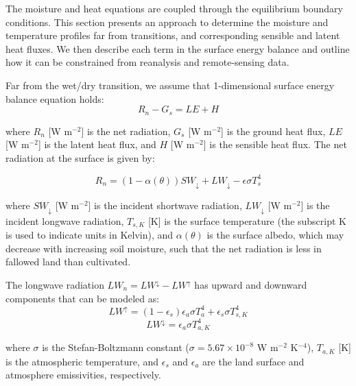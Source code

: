 \documentclass{article}
\begin{document}
    The moisture and heat equations are coupled through the equilibrium boundary conditions. 
     This section presents an approach to determine the moisture and temperature profiles far from transitions, and corresponding sensible and latent heat fluxes. 
    We then describe each term in the surface energy balance and outline how it can be constrained from reanalysis and remote-sensing data.

    Far from the wet/dry transition,
    we assume that 1-dimensional surface energy balance equation holds:
    \begin{equation}
    \label{eq:energy_upwind}
     R_n - G_s =  LE + H
    \end{equation}

     where $R_n$ [W m$^{-2}$] is the net radiation, $G_s$ [W m$^{-2}$] is the ground heat flux, $LE$ [W m$^{-2}$] is the latent heat flux, and $H$ [W m$^{-2}$] is the sensible heat flux.  
    The net radiation at the surface is given by:

    \begin{equation}
        R_n = (1- \alpha(\theta)) SW_{\downarrow} + LW_\downarrow - \epsilon \sigma T_s^4
    \end{equation}

    where $SW_\downarrow$ [W m$^{-2}$] is the incident shortwave radiation,  
    $LW_{\downarrow}$ [W m$^{-2}$] is the  incident longwave radiation,  
    $T_{s,K}$ [K] is the surface temperature (the subscript K is used to indicate units in Kelvin), and
    $\alpha(\theta)$ is the surface albedo, which may decrease with increasing soil moisture, such that the net radiation is less in fallowed land than cultivated.

    The longwave radiation $LW_n = LW^\downarrow - LW^\uparrow$ has  upward and downward  components that can be modeled as:
    \begin{equation}
    LW^\uparrow = (1 - \epsilon_s)\epsilon_a \sigma T_a^4 + \epsilon_s \sigma T_{s,K}^4   
    \label{eq:LW_up}
    \end{equation}
    \begin{equation}
    LW^\downarrow = \epsilon_a \sigma T_{a,K}^4    
    \label{eq:LW_down}
    \end{equation}

    where $\sigma$ is the Stefan-Boltzmann constant ($\sigma = 5.67 \times 10^{-8}$ W m$^{-2}$ K$^{-4}$),   $T_{a,K}$ [K]  is the atmospheric temperature, and $\epsilon_s$ and $\epsilon_a$ are the land surface and atmosphere emissivities, respectively. 
\end{document}
